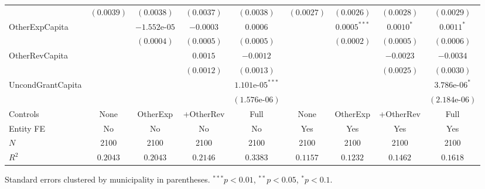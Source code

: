 \begin{table}[H]
\begin{minipage}{\textwidth}
\begin{tabular}{lcccccccc}
         & $(0.0039)$ & $(0.0038)$ & $(0.0037)$ & $(0.0038)$ & $(0.0027)$ & $(0.0026)$ & $(0.0028)$ & $(0.0029)$ \\[4pt]
        OtherExpCapita &  & $-1.552\text{e-}05$ & $-0.0003$ & $0.0006$ &  & $0.0005^{***}$ & $0.0010^{*}$ & $0.0011^{*}$ \\
         &  & $(0.0004)$ & $(0.0005)$ & $(0.0005)$ &  & $(0.0002)$ & $(0.0005)$ & $(0.0006)$ \\[4pt]
        OtherRevCapita &  &  & $0.0015$ & $-0.0012$ &  &  & $-0.0023$ & $-0.0034$ \\
         &  &  & $(0.0012)$ & $(0.0013)$ &  &  & $(0.0025)$ & $(0.0030)$ \\[4pt]
        UncondGrantCapita &  &  &  & $1.101\text{e-}05^{***}$ &  &  &  & $3.786\text{e-}06^{*}$ \\
         &  &  &  & $(1.576\text{e-}06)$ &  &  &  & $(2.184\text{e-}06)$ \\[4pt]
        \midrule
        Controls & None & OtherExp & +OtherRev & Full & None & OtherExp & +OtherRev & Full \\
        Entity FE & No & No & No & No & Yes & Yes & Yes & Yes \\
        $N$ & 2100 & 2100 & 2100 & 2100 & 2100 & 2100 & 2100 & 2100 \\
        $R^2$ & $0.2043$ & $0.2043$ & $0.2146$ & $0.3383$ & $0.1157$ & $0.1232$ & $0.1462$ & $0.1618$ \\
        \bottomrule
    \end{tabular}

    \vspace{6pt}
    {\scriptsize Standard errors clustered by municipality in parentheses. $^{***}p<0.01$, $^{**}p<0.05$, $^{*}p<0.1$.}
    \end{minipage}
\end{table}